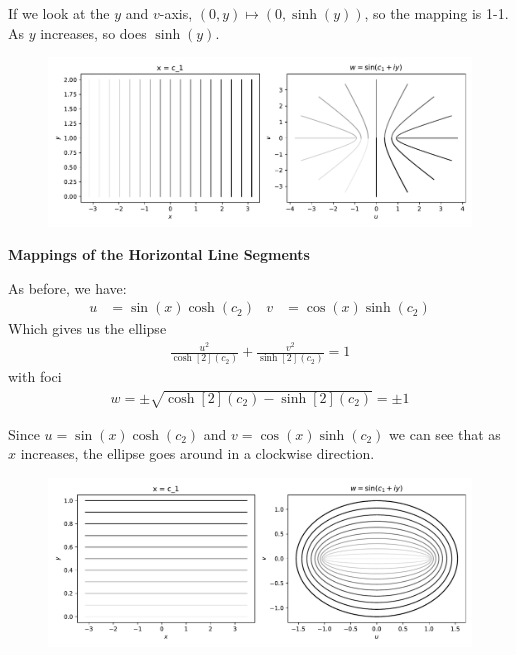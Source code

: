 \documentclass[12pt, english]{book}
\begin{document}
	If we look at the \(y\) and \(v\)-axis,  \((0, y) \mapsto (0, \sinh(y))\), so the mapping is 1-1. As \(y\) increases, so does \(\sinh(y)\).
	
	\begin{figure}[H]
		\centering
		\includegraphics[width=0.9\linewidth]{Python/Mapping_by_Sine_V}
		\label{fig:mappingbysinev}
		\caption*{}
	\end{figure}

	\textbf{Mappings of the Horizontal Line Segments}
	
	As before, we have:
	\begin{align*}
		u &= \sin(x) \cosh(c_2) & v &= \cos(x) \sinh(c_2)
	\end{align*}
	Which gives us the ellipse
	\begin{align*}
		\frac{u^2}{\cosh[2](c_2)} + \frac{v^2}{\sinh[2](c_2)} = 1
	\end{align*}
	with foci
	\begin{align*}
		w = \pm \sqrt{\cosh[2](c_2) - \sinh[2](c_2)} = \pm 1
	\end{align*}

	Since \(u = \sin(x) \cosh(c_2)\) and \(v = \cos(x) \sinh(c_2)\) we can see that as \(x\) increases, the ellipse goes around in a clockwise direction. 
	
	\begin{figure}[H]
		\centering
		\includegraphics[width=0.9\linewidth]{Python/Mapping_by_Sine_H}
		\caption*{}
		\label{fig:mappingbysineh}
	\end{figure}
\end{document}
